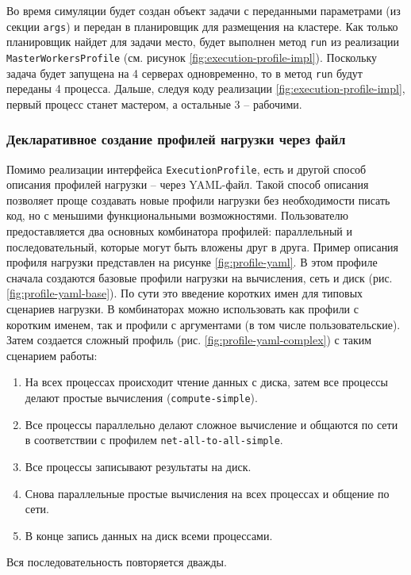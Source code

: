 Во время симуляции будет создан объект задачи с переданными параметрами (из секции \texttt{args}) и передан в планировщик для размещения на кластере. Как только планировщик найдет для задачи место, будет выполнен метод \texttt{run} из реализации \texttt{MasterWorkersProfile} (см. рисунок \ref{fig:execution-profile-impl}). Поскольку задача будет запущена на 4 серверах одновременно, то в метод \texttt{run} будут переданы 4 процесса. Дальше, следуя коду реализации \ref{fig:execution-profile-impl}, первый процесс станет мастером, а остальные 3 -- рабочими. 

\subsubsection{Декларативное создание профилей нагрузки через файл}

Помимо реализации интерфейса \texttt{ExecutionProfile}, есть и другой способ описания профилей нагрузки -- через YAML-файл. Такой способ описания позволяет проще создавать новые профили нагрузки без необходимости писать код, но с меньшими функциональными возможностями. Пользователю предоставляется два основных комбинатора профилей: параллельный и последовательный, которые могут быть вложены друг в друга. Пример описания профиля нагрузки представлен на рисунке \ref{fig:profile-yaml}. В этом профиле сначала создаются базовые профили нагрузки на вычисления, сеть и диск (рис. \ref{fig:profile-yaml-base}). По сути это введение коротких имен для типовых сценариев нагрузки. В комбинаторах можно использовать как профили с коротким именем, так и профили с аргументами (в том числе пользовательские). Затем создается сложный профиль (рис. \ref{fig:profile-yaml-complex}) с таким сценарием работы: 
\begin{enumerate}
  \item На всех процессах происходит чтение данных с диска, затем все процессы делают простые вычисления (\texttt{compute-simple}).
  \item Все процессы параллельно делают сложное вычисление и общаются по сети в соответствии с профилем \texttt{net-all-to-all-simple}.\item Все процессы записывают результаты на диск. 
  \item Снова параллельные простые вычисления на всех процессах и общение по сети.
  \item В конце запись данных на диск всеми процессами.
\end{enumerate}

Вся последовательность повторяется дважды. 

